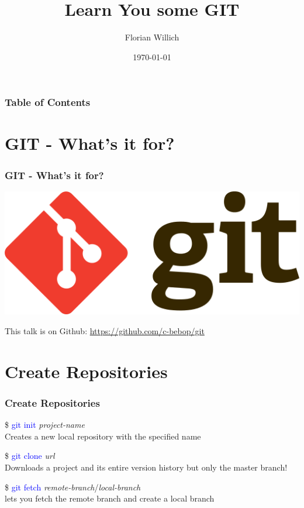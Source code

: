 \documentclass[aspectratio=169]{beamer}
\title[Learn You some GIT] %
{Learn You some GIT}
\author[Florian Willich]{Florian Willich}
\institute[BIT]
{
  Quality and Usability Lab\\
  Berlin Institute of Technology
}
\date{\today}
\begin{document}
\frame{\titlepage}

\begin{frame}
\frametitle{Table of Contents}
\tableofcontents
\end{frame}

\section{GIT - What's it for?}
\begin{frame}

\frametitle{GIT - What's it for?}

\begin{center}
\includegraphics*[scale=0.5]{images/Git-logo.png}

This talk is on Github: \hyperlink{https://github.com/c-bebop/git}{https://github.com/c-bebop/git}
\end{center}

\end{frame}

\section{Create Repositories}
\begin{frame}

\frametitle{Create Repositories}

\$ \textcolor{blue}{git init} \textit{project-name}\\
Creates a new local repository with the specified name

\pause

\$ \textcolor{blue}{git clone} \textit{url}\\
Downloads a project and its entire version history but only the master branch!

\pause

\$ \textcolor{blue}{git fetch} \textit{remote-branch}/\textit{local-branch}\\
lets you fetch the remote branch and create a local branch

\end{frame}
\end{document}
